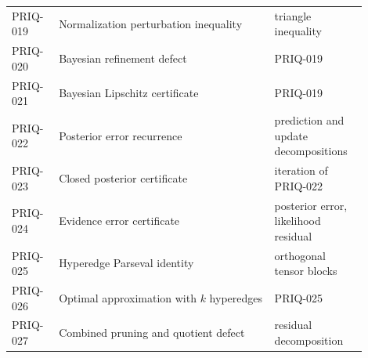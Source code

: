 \documentclass[11pt,oneside,openany]{book}
\numberwithin{equation}{section}
\begin{document}
\begin{longtable}{@{}p{0.12\linewidth}p{0.55\linewidth}p{0.23\linewidth}@{}}
PRIQ-019 & Normalization perturbation inequality & triangle inequality\\
PRIQ-020 & Bayesian refinement defect & PRIQ-019\\
PRIQ-021 & Bayesian Lipschitz certificate & PRIQ-019\\
PRIQ-022 & Posterior error recurrence & prediction and update decompositions\\
PRIQ-023 & Closed posterior certificate & iteration of PRIQ-022\\
PRIQ-024 & Evidence error certificate & posterior error, likelihood residual\\
PRIQ-025 & Hyperedge Parseval identity & orthogonal tensor blocks\\
PRIQ-026 & Optimal approximation with $k$ hyperedges & PRIQ-025\\
PRIQ-027 & Combined pruning and quotient defect & residual decomposition\\
\bottomrule
\end{longtable}
\end{document}
